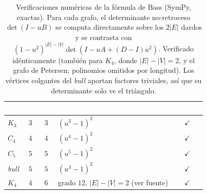 \begin{table}[t]
  \centering
  \small
  \caption{Verificaciones num\'ericas de la f\'ormula de Bass (SymPy, exactas). Para cada grafo, el
  determinante no-retroceso $\det(I-uB)$ se computa directamente sobre los $2|E|$ dardos y se contrasta
  con $(1-u^2)^{|E|-|V|}\det(I-uA+(D-I)u^2)$. Verificado id\'enticamente (tambi\'en para $K_4$, donde
  $|E|-|V|=2$, y el grafo de Petersen; polinomios omitidos por longitud). Los v\'ertices colgantes del
  \emph{bull} aportan factores triviales, as\'i que su determinante solo ve el tri\'angulo.}
  \label{tab:bass_checks}
  \begin{tabular}{@{}lcclc@{}}
    \toprule
    \rowcolor{ggteal}
    \textcolor{white}{\textbf{$G$}} & \textcolor{white}{\textbf{$|V|$}} & \textcolor{white}{\textbf{$|E|$}} & \textcolor{white}{\textbf{$\det(I-uB)$}} & \textcolor{white}{\textbf{¿Bass?}} \\
    \midrule
    \rowcolor{ggband}
    $K_3$  & $3$ & $3$ & $(u^{3}-1)^{2}$ & $\checkmark$ \\
    $C_4$  & $4$ & $4$ & $(u^{4}-1)^{2}$ & $\checkmark$ \\
    \rowcolor{ggband}
    $C_5$  & $5$ & $5$ & $(u^{5}-1)^{2}$ & $\checkmark$ \\
    \emph{bull} & $5$ & $5$ & $(u^{3}-1)^{2}$ & $\checkmark$ \\
    \rowcolor{ggband}
    $K_4$  & $4$ & $6$ & grado $12$, $|E|-|V|=2$ (ver fuente) & $\checkmark$ \\
    \bottomrule
  \end{tabular}
\end{table}
